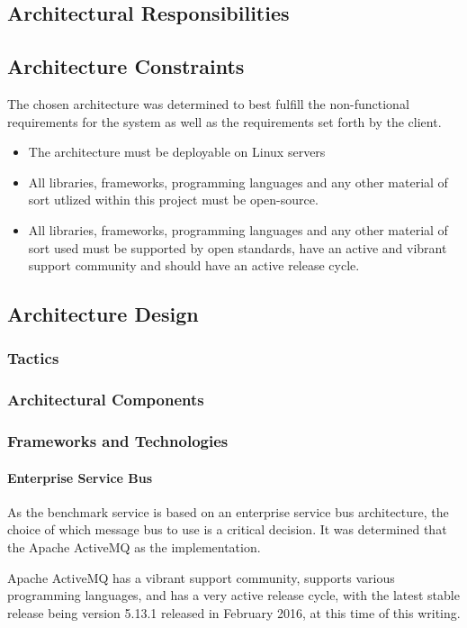 \subsection{Architectural Responsibilities}

\subsection{Architecture Constraints}

\label{sec:systemArchitecturalConstraints}
The chosen architecture was determined to best fulfill the non-functional
requirements for the system as well as the requirements set forth by the
client.
\begin{itemize}
	\item The architecture must be deployable on Linux servers
	\item All libraries, frameworks, programming languages and any other
	material of sort utlized within this project must be open-source.
	\item All libraries, frameworks, programming languages and any other
	material of sort used must be supported by open standards, have an 
	active and vibrant support community and should have an active 
	release cycle. 	
\end{itemize}

\subsection{Architecture Design}
\subsubsection{Tactics}
\subsubsection{Architectural Components}
\subsubsection{Frameworks and Technologies}
\paragraph{Enterprise Service Bus}
As the benchmark service is based on an enterprise service bus architecture,
the choice of which message bus to use is a critical decision. It was determined
that the Apache ActiveMQ as the implementation. 

Apache ActiveMQ has a vibrant support community, supports various programming
languages, and has a very active release cycle, with the latest stable release
being version 5.13.1 released in February 2016, at this time of this writing.

